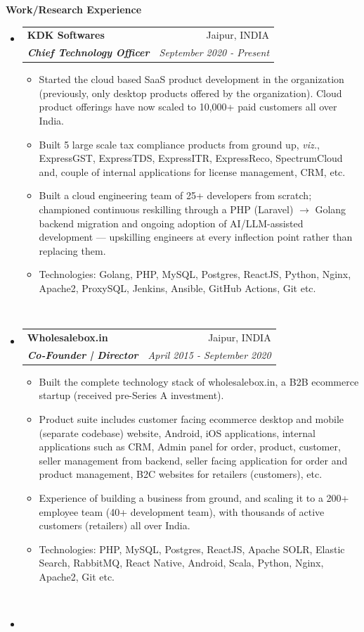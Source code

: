 \documentclass[letterpaper,11pt]{article}
\makeatletter
\newcommand{\resitem}[1]{\item #1 \vspace{-2pt}}
\newcommand{\resheading}[1]{{\large \colorbox{mygrey}{\begin{minipage}{\textwidth}{\textbf{#1 \vphantom{p\^{E}}}}\end{minipage}}}}
\newcommand{\ressubheading}[4]{
\begin{tabular*}{7.0in}{l@{\extracolsep{\fill}}r}
		\textbf{#1} & #2 \\
		\textit{#3} & \textit{#4} \\
\end{tabular*}\vspace{-6pt}}
\makeatother
\begin{document}
\resheading{Work/Research Experience}
\begin{itemize}
	\item
	\ressubheading{KDK Softwares }{Jaipur, INDIA}{\textbf{Chief Technology Officer}}{September 2020 - Present}
	\begin{itemize}
	  \resitem{Started the cloud based SaaS product development in the organization (previously, only desktop products offered by the organization). Cloud product offerings have now scaled to 10,000+ paid customers all over India.}
	  \resitem{Built 5 large scale tax compliance products from ground up, \textit{viz.}, ExpressGST, ExpressTDS, ExpressITR, ExpressReco, SpectrumCloud and, couple of internal applications for license management, CRM, etc.}
	  \resitem{Built a cloud engineering team of 25+ developers from scratch; championed continuous reskilling through a PHP (Laravel) $\rightarrow$ Golang backend migration and ongoing adoption of AI/LLM-assisted development --- upskilling engineers at every inflection point rather than replacing them.}
	  \resitem{Technologies: Golang, PHP, MySQL, Postgres, ReactJS, Python, Nginx, Apache2, ProxySQL, Jenkins, Ansible, GitHub Actions, Git etc. }
	\end{itemize} ~\\ \vspace{-10pt}
	\item
	      \ressubheading{Wholesalebox.in }{Jaipur, INDIA}{\textbf{Co-Founder | Director}}{April 2015 - September 2020}
	      \begin{itemize}
			\resitem{Built the complete technology stack of wholesalebox.in, a B2B ecommerce startup (received pre-Series A investment).}
			\resitem{Product suite includes customer facing ecommerce desktop and mobile (separate codebase) website, Android, iOS applications, internal applications such as CRM, Admin panel for order, product, customer, seller management from backend, seller facing application for order and product management, B2C websites for retailers (customers), etc.}
			\resitem{Experience of building a business from ground, and scaling it to a 200+ employee team (40+ development team), with thousands of active customers (retailers) all over India.}
			\resitem{Technologies: PHP, MySQL, Postgres, ReactJS, Apache SOLR, Elastic Search, RabbitMQ, React Native, Android, Scala, Python, Nginx, Apache2, Git etc. }
	      \end{itemize} ~\\ \vspace{-10pt}
	\item

\end{itemize}
\end{document}
